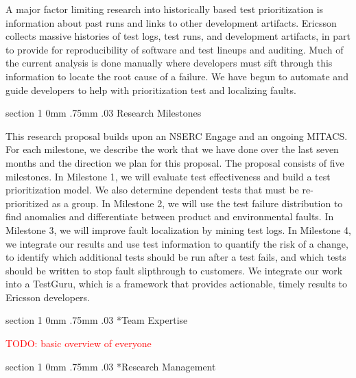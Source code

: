\documentclass[12pt, letterpaper]{article}
\makeatletter
\newcommand{\todo}[1]{\textcolor{red}{TODO: #1}\PackageWarning{TODO:}{#1!}}
\renewcommand{\section}{\@startsection
{section}%
{1}%
{0mm}%
{.75mm}
{.03\baselineskip}%
{\normalfont\large\bf} %
}
\makeatother
\begin{document}
A major factor limiting research into historically based test prioritization is
information about past runs and links to other development artifacts.  Ericsson
collects massive histories of test logs, test runs, and development artifacts, in
part to provide for reproducibility of software and test lineups and auditing.
Much of the current analysis is done manually where developers must sift
through this information to locate the root cause of a failure. We have begun
to automate and guide developers to help with prioritization test and
localizing faults.



\section{Research Milestones} 

This research proposal builds upon an NSERC Engage and an ongoing MITACS. For
each milestone, we describe the work that we have done over the last seven months
and the direction we plan for this proposal. The proposal consists of five 
milestones. In Milestone 1, we will evaluate test effectiveness and build a
test prioritization model. We also determine dependent tests that must be re-prioritized as a group. In Milestone 2, we will use the test failure
distribution to find anomalies and differentiate between product and
environmental faults. In Milestone 3, we will improve fault localization by
mining test logs. In Milestone 4, we integrate our results and use test
information to quantify the risk of a change, to identify which additional
tests should be run after a test fails, and which tests should be written to
stop fault slipthrough to customers.  We integrate our work into a TestGuru, which is a framework
that provides actionable, timely results to Ericsson developers.









\section*{Team Expertise}

\todo{basic overview of everyone}

\section*{Research Management}
\end{document}
